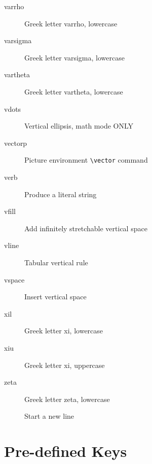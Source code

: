 \begin{small}
\begin{description}
\item[\bs varrho]         Greek letter varrho, lowercase
\item[\bs varsigma]       Greek letter varsigma, lowercase
\item[\bs vartheta]       Greek letter vartheta, lowercase
\item[\bs vdots]          Vertical ellipsis, math mode ONLY
\item[\bs vector\us p]       Picture environment \verb|\vector| command
\item[\bs verb]           Produce a literal string
\item[\bs vfill]          Add infinitely stretchable vertical space
\item[\bs vline]          Tabular vertical rule
\item[\bs vspace]         Insert vertical space
\item[\bs xi\us l]           Greek letter xi, lowercase
\item[\bs xi\us u]           Greek letter xi, uppercase
\item[\bs zeta]           Greek letter zeta, lowercase
\item[\bs \bs]              Start a new line
\end{description}
\end{small}

\newpage
\section{Pre-defined Keys} \label{keydefs}

